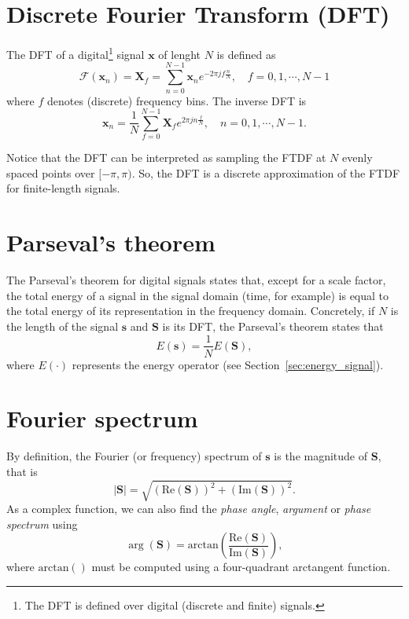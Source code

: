 \section{Discrete Fourier Transform (DFT)}
\label{sec:DFT}

The \gls{DFT} of a digital\footnote{The \gls{DFT} is defined over
  digital (discrete and finite) signals.} signal $\mathbf{x}$ of
lenght $N$ is defined as
\begin{equation}
  \mathcal{F}(\mathbf{x}_n) = \mathbf{X}_f=\sum_{n=0}^{N-1}\mathbf{x}_ne^{-2\pi jf\frac{n}{N}},\quad f=0,1,\cdots,N-1
  \label{eq:DFT}
\end{equation}
where $f$ denotes (discrete) frequency bins. The inverse \gls{DFT} is
\begin{equation}
  \mathbf{x}_n=\frac{1}{N}\sum_{f=0}^{N-1}\mathbf{X}_fe^{2\pi jn\frac{f}{N}}, \quad  n=0,1,\cdots,N-1.
\end{equation}

Notice that the \gls{DFT} can be interpreted as sampling the
\gls{FTDF} at $N$ evenly spaced points over $[-\pi, \pi)$. So, the
\gls{DFT} is a discrete approximation of the \gls{FTDF} for
finite-length signals.


\section{Parseval's theorem}
\label{sec:parseval}

The Parseval's theorem for digital signals states that, except for a
scale factor, the total energy of a signal in the signal domain (time,
for example) is equal to the total energy of its representation in the
frequency domain. Concretely, if $N$ is the length of the signal
$\mathbf{s}$ and $\mathbf{S}$ is its \gls{DFT}, the Parseval’s theorem
states that
\begin{equation}
  E(\mathbf{s}) = \frac{1}{N}E(\mathbf{S}),
\end{equation}
where $E(\cdot)$ represents the energy operator (see
Section~\ref{sec:energy_signal}).


\section{Fourier spectrum}
\label{sec:Fourier_spectrum}

By definition, the Fourier
(or frequency) spectrum of $\mathbf{s}$ is the magnitude of
$\mathbf{S}$, that is
\begin{equation}
  |\mathbf{S}| = \sqrt{(\text{Re}(\mathbf{S}))^2+(\text{Im}(\mathbf{S}))^2}.
\end{equation}
As a complex function, we can also find the \emph{phase angle}, \emph{argument} or
\emph{phase spectrum} using
\begin{equation}
  \arg({\mathbf{S}}) = \text{arctan}\left(\frac{\text{Re}(\mathbf{S})}{\text{Im}(\mathbf{S})}\right),
\end{equation}
where $\text{arctan}()$ must be computed using a four-quadrant
arctangent function.

